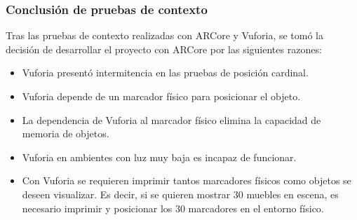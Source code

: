 \subsubsection{Conclusión de pruebas de contexto}
Tras las pruebas de contexto realizadas con ARCore y Vuforia, se tomó la decisión de desarrollar el proyecto con ARCore por las siguientes razones:
\begin{itemize}
	\item Vuforia presentó intermitencia en las pruebas de posición cardinal.
	\item Vuforia depende de un marcador físico para posicionar el objeto.
	\item La dependencia de Vuforia al marcador físico elimina la capacidad de memoria de objetos.
	\item Vuforia en ambientes con luz muy baja es incapaz de funcionar.
	\item Con Vuforia se requieren imprimir tantos marcadores físicos como objetos se deseen visualizar. Es decir, si se quieren mostrar 30 muebles en escena, es necesario imprimir y posicionar los 30 marcadores en el entorno físico.
\end{itemize}
\newpage


